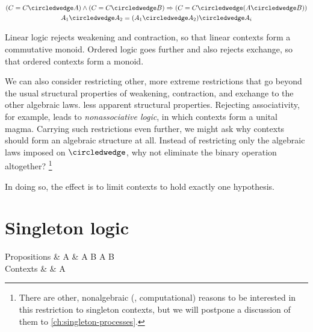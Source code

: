 \begin{gather*}
  (C = C \circledwedge A) \land (C = C \circledwedge B) \Rightarrow (C = C \circledwedge (A \circledwedge B)) \\
  A_1 \circledwedge A_2 = (A_1 \circledwedge A_2) \circledwedge A_i
\end{gather*}


Linear logic rejects weakening and contraction, so that linear contexts form a commutative monoid.
Ordered logic goes further and also rejects exchange, so that ordered contexts form a monoid.

We can also consider restricting other, more extreme restrictions that go beyond the usual structural properties of weakening, contraction, and exchange to the other algebraic laws.
less apparent structural properties.
Rejecting associativity, for example, leads to \emph{nonassociative logic}\autocite{}, in which contexts form a unital magma.
Carrying such restrictions even further, we might ask why contexts should form an algebraic structure at all.
Instead of restricting only the algebraic laws imposed on $\circledwedge$, why not eliminate the binary operation altogether?%
\footnote{There are other, nonalgebraic (\ie, computational) reasons to be interested in this restriction to singleton contexts, but we will postpone a discussion of them to \cref{ch:singleton-processes}.}

In doing so, the effect is to limit contexts to hold exactly one hypothesis.

\section{Singleton logic}

\begin{syntax*}
  Propositions &
    A & \alpha \mid A \plus B \mid \zero \mid A \with B \mid \top
  \\
  Contexts & \sctx & A
\end{syntax*}


